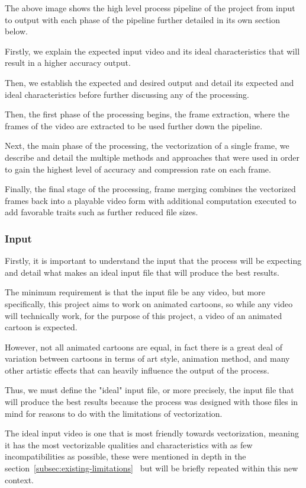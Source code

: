 \documentclass[12pt]{article}
\newcommand{\sentence}{} %
\newcommand{\fullref}[1]{\ref{#1}~\nameref{#1}}
\begin{document}
    The above image shows the high level process pipeline of the project from input to output with each phase of the
    pipeline further detailed in its own section below.
    \sentence
    Firstly, we explain the expected input video and its ideal characteristics that will result in a higher accuracy
    output.
    \sentence
    Then, we establish the expected and desired output and detail its expected and ideal characteristics before
    further discussing any of the processing.
    \sentence
    Then, the first phase of the processing begins, the frame extraction, where the frames of the video are
    extracted to be used further down the pipeline.
    \sentence
    Next, the main phase of the processing, the vectorization of a single frame, we describe and detail the multiple methods
    and approaches that were used in order to gain the highest level of accuracy and compression rate on each frame.
    \sentence
    Finally, the final stage of the processing, frame merging combines the vectorized frames back into a playable
    video form with additional computation executed to add favorable traits such as further reduced file sizes.

    \subsubsection{Input}\label{subsubsec:input}

    \tab
    Firstly, it is important to understand the input that the process will be expecting and detail what makes an ideal
    input file that will produce the best results.
    \sentence
    The minimum requirement is that the input file be any video, but more specifically, this project
    aims to work on animated cartoons, so while any video will technically work, for the purpose of this project, a
    video of an animated cartoon is expected.
    \sentence
    However, not all animated cartoons are equal, in fact there is a great deal of variation between cartoons in
    terms of art style, animation method, and many other artistic effects that can heavily influence the output of
    the process.
    \sentence
    Thus, we must define the "ideal" input file, or more precisely, the input file that will produce the best results
    because the process was designed with those files in mind for reasons to do with the limitations of vectorization.
    \sentence
    The ideal input video is one that is most friendly towards vectorization, meaning it has the most vectorizable
    qualities and characteristics with as few incompatibilities as possible, these were mentioned in depth
    in the section~\fullref{subsec:existing-limitations} but will be briefly repeated within this new context.
\end{document}

